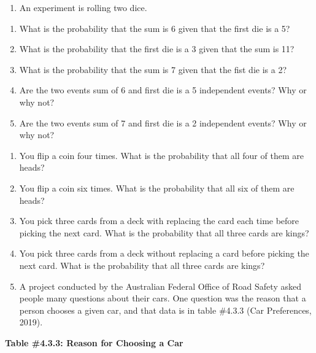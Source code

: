 \documentclass[
]{book}
\providecommand{\tightlist}{%
  \setlength{\itemsep}{0pt}\setlength{\parskip}{0pt}}
\begin{document}
\begin{enumerate}
\def\labelenumi{\arabic{enumi}.}
\setcounter{enumi}{5}
\tightlist
\item
  An experiment is rolling two dice.
\end{enumerate}

\begin{enumerate}
\def\labelenumi{\alph{enumi}.}
\tightlist
\item
  What is the probability that the sum is 6 given that the first die is a 5?
\item
  What is the probability that the first die is a 3 given that the sum is 11?
\item
  What is the probability that the sum is 7 given that the fist die is a 2?
\item
  Are the two events sum of 6 and first die is a 5 independent events? Why or why not?
\item
  Are the two events sum of 7 and first die is a 2 independent events? Why or why not?
\end{enumerate}

\begin{enumerate}
\def\labelenumi{\arabic{enumi}.}
\setcounter{enumi}{6}
\item
  You flip a coin four times. What is the probability that all four of them are heads?
\item
  You flip a coin six times. What is the probability that all six of them are heads?
\item
  You pick three cards from a deck with replacing the card each time before picking the next card. What is the probability that all three cards are kings?
\item
  You pick three cards from a deck without replacing a card before picking the next card. What is the probability that all three cards are kings?
\item
  A project conducted by the Australian Federal Office of Road Safety asked people many questions about their cars. One question was the reason that a person chooses a given car, and that data is in table \#4.3.3 (Car Preferences, 2019).
\end{enumerate}

\textbf{Table \#4.3.3: Reason for Choosing a Car}
\end{document}
